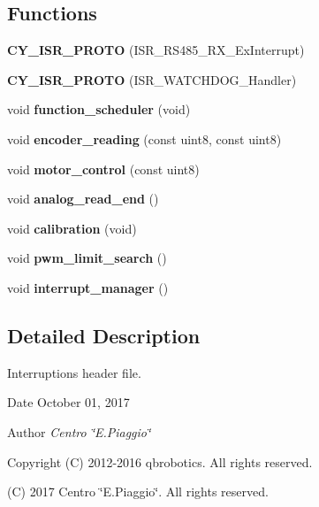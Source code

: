 \subsection*{Functions}
\begin{DoxyCompactItemize}
\item 
\mbox{\label{interruptions_8h_a7e24af8c83537b0441877bf0f00dd30a}} 
{\bfseries C\+Y\+\_\+\+I\+S\+R\+\_\+\+P\+R\+O\+TO} (I\+S\+R\+\_\+\+R\+S485\+\_\+\+R\+X\+\_\+\+Ex\+Interrupt)
\item 
\mbox{\label{interruptions_8h_a212cae8995d67d612c236fb54a4d29dc}} 
{\bfseries C\+Y\+\_\+\+I\+S\+R\+\_\+\+P\+R\+O\+TO} (I\+S\+R\+\_\+\+W\+A\+T\+C\+H\+D\+O\+G\+\_\+\+Handler)
\item 
\mbox{\label{interruptions_8h_a39df971c4e9f194be50c54dfd7aeabfe}} 
void {\bfseries function\+\_\+scheduler} (void)
\item 
\mbox{\label{interruptions_8h_a2d58475fb61b7d077e6c34ccf0499198}} 
void {\bfseries encoder\+\_\+reading} (const uint8, const uint8)
\item 
\mbox{\label{interruptions_8h_a94830a771fd71aa5b49ce0b08207985b}} 
void {\bfseries motor\+\_\+control} (const uint8)
\item 
\mbox{\label{interruptions_8h_a00a8d34962a63161405e5d7785b9625e}} 
void {\bfseries analog\+\_\+read\+\_\+end} ()
\item 
\mbox{\label{interruptions_8h_a0b6a0b24c6bd8af032a6778166201f7e}} 
void {\bfseries calibration} (void)
\item 
\mbox{\label{interruptions_8h_ab7b287cf5df2ea548297b951be2f20d4}} 
void {\bfseries pwm\+\_\+limit\+\_\+search} ()
\item 
\mbox{\label{interruptions_8h_a9790811526002d99b25a814afd02cbae}} 
void {\bfseries interrupt\+\_\+manager} ()
\end{DoxyCompactItemize}


\subsection{Detailed Description}
Interruptions header file. 

\begin{DoxyDate}{Date}
October 01, 2017 
\end{DoxyDate}
\begin{DoxyAuthor}{Author}
{\itshape Centro \char`\"{}\+E.\+Piaggio\char`\"{}} 
\end{DoxyAuthor}
\begin{DoxyCopyright}{Copyright}
(C) 2012-\/2016 qbrobotics. All rights reserved. 

(C) 2017 Centro \char`\"{}\+E.\+Piaggio\char`\"{}. All rights reserved. 
\end{DoxyCopyright}
